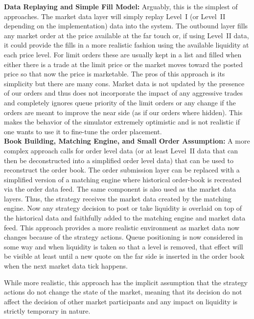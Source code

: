 \noindent\textbf{Data Replaying and Simple Fill Model:} Arguably, this is the simplest of approaches. The market data layer will simply replay Level~I (or Level~II depending on the implementation) data into the system. The outbound layer fills any market order at the price available at the far touch or, if using Level~II data, it could provide the fills in a more realistic fashion using the available liquidity at each price level. For limit orders these are usually kept in a list and filled when either there is a trade at the limit price or the market moves toward the posted price so that now the price is marketable. The pros of this approach is its simplicity but there are many cons. Market data is not updated by the presence of our orders and thus does not incorporate the impact of any aggressive trades and completely ignores queue priority of the limit orders or any change if the orders are meant to improve the near side (as if our orders where hidden). This makes the behavior of the simulator extremely optimistic and is not realistic if one wants to use it to fine-tune the order placement. \\


\noindent\textbf{Book Building, Matching Engine, and Small Order Assumption:} A more complex approach calls for order level data (or at least Level~II data that can then be deconstructed into a simplified order level data) that can be used to reconstruct the order book. The order submission layer can be replaced with a simplified version of a matching engine where historical order-book is recreated via the order data feed. The same component is also used as the market data layers. Thus, the strategy receives the market data created by the matching engine. Now any strategy decision to post or take liquidity is overlaid on top of the historical data and faithfully added to the matching engine and market data feed. This approach provides a more realistic environment as market data now changes because of the strategy actions. Queue positioning is now considered in some way and when liquidity is taken so that a level is removed, that effect will be visible at least until a new quote on the far side is inserted in the order book when the next market data tick happens.


While more realistic, this approach has the implicit assumption that the strategy actions do not change the state of the market, meaning that its decision do not affect the decision of other market participants and any impact on liquidity is strictly temporary in nature. \\


